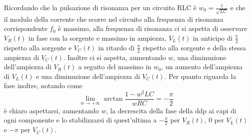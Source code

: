 \documentclass{article}
\begin{document}
Ricordando che la pulsazione di risonanza per un circuito RLC è $w_0=\frac{1}{\sqrt{LC}}$ e che il modulo della corrente che scorre nel circuito alla frequenza di risonanza corrispondente $f_0$ è massimo, alla frequenza di risonanza ci si aspetta di 
osservare $V_R(t)$ in fase con la sorgente e massimo in ampiezza, $V_L(t)$ in anticipo di $\frac{\pi}{2}$ rispetto alla sorgente e $V_C(t)$ in ritardo di $\frac{\pi}{2}$ rispetto alla sorgente e della stessa ampiezza di  $V_C(t)$. Inoltre ci 
si aspetta, aumentando $w$, una diminuzione dell'ampiezza di $V_R(t)$ a seguito del massimo in $w_0$, un aumento dell'ampiezza di  $V_L(t)$
e una diminuzione dell'ampiezza di $V_C(t)$. Per quanto riguarda la fase inoltre, notando come 
\begin{equation}
  \lim_{w \to + \infty}\arctan{\frac{1-w^2LC}{wRC}} = -\frac{\pi}{2}
\end{equation}
è chiaro aspettarsi, aumentando $w$, la decrescita della fase della ddp ai capi di ogni componente e lo stabilizzarsi di quest'ultima a $-\frac{\pi}{2}$ per $V_R(t)$, 0 per $V_L(t)$ e $-\pi$ per $V_C(t)$.
\end{document}
